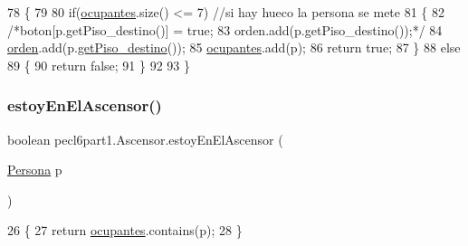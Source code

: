\begin{DoxyCode}
78     \{
79         
80         \textcolor{keywordflow}{if}(\mbox{\hyperlink{classpecl6part1_1_1_ascensor_aabf71a3bf26b3bff458534e518835c71}{ocupantes}}.size() <= 7) \textcolor{comment}{//si hay hueco la persona se mete}
81         \{
82             \textcolor{comment}{/*boton[p.getPiso\_destino()] = true;}
83 \textcolor{comment}{            orden.add(p.getPiso\_destino());*/}
84             \mbox{\hyperlink{classpecl6part1_1_1_ascensor_adbe3c1b625d285b4b5011ef0235f3c9f}{orden}}.add(p.\mbox{\hyperlink{classpecl6part1_1_1_persona_a82e55b6a597ab6cc0aa1d8fcfed9164b}{getPiso\_destino}}());
85             \mbox{\hyperlink{classpecl6part1_1_1_ascensor_aabf71a3bf26b3bff458534e518835c71}{ocupantes}}.add(p);
86             \textcolor{keywordflow}{return} \textcolor{keyword}{true};
87         \}
88         \textcolor{keywordflow}{else}
89         \{
90             \textcolor{keywordflow}{return} \textcolor{keyword}{false};
91         \}
92         
93     \}
\end{DoxyCode}
\mbox{\label{classpecl6part1_1_1_ascensor_af9df13b79ebb74d8db4277d32c7c2bf5}} 
\subsubsection{\texorpdfstring{estoy\+En\+El\+Ascensor()}{estoyEnElAscensor()}}
{\footnotesize\ttfamily boolean pecl6part1.\+Ascensor.\+estoy\+En\+El\+Ascensor (\begin{DoxyParamCaption}\item[{\mbox{\hyperlink{classpecl6part1_1_1_persona}{Persona}}}]{p }\end{DoxyParamCaption})\hspace{0.3cm}{\ttfamily [inline]}}


\begin{DoxyCode}
26     \{
27         \textcolor{keywordflow}{return} \mbox{\hyperlink{classpecl6part1_1_1_ascensor_aabf71a3bf26b3bff458534e518835c71}{ocupantes}}.contains(p);
28     \}
\end{DoxyCode}
\mbox{\label{classpecl6part1_1_1_ascensor_aff7ce91902c28ffca4ef4bff6622bb24}} 
